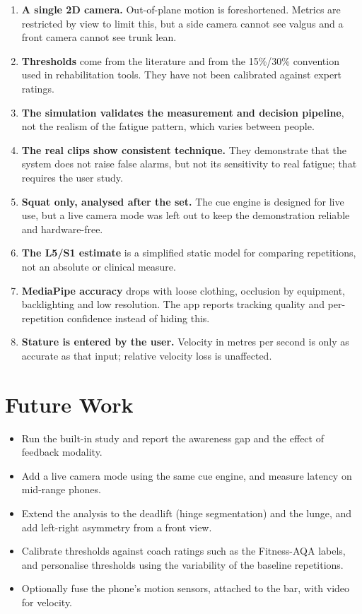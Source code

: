 \documentclass[12pt]{article}
\begin{document}
\begin{enumerate}
    \item \textbf{A single 2D camera.} Out-of-plane motion is foreshortened. Metrics are restricted by view to limit this, but a side camera cannot see valgus and a front camera cannot see trunk lean.
    \item \textbf{Thresholds} come from the literature and from the 15\%/30\% convention used in rehabilitation tools. They have not been calibrated against expert ratings.
    \item \textbf{The simulation validates the measurement and decision pipeline}, not the realism of the fatigue pattern, which varies between people.
    \item \textbf{The real clips show consistent technique.} They demonstrate that the system does not raise false alarms, but not its sensitivity to real fatigue; that requires the user study.
    \item \textbf{Squat only, analysed after the set.} The cue engine is designed for live use, but a live camera mode was left out to keep the demonstration reliable and hardware-free.
    \item \textbf{The L5/S1 estimate} is a simplified static model for comparing repetitions, not an absolute or clinical measure.
    \item \textbf{MediaPipe accuracy} drops with loose clothing, occlusion by equipment, backlighting and low resolution. The app reports tracking quality and per-repetition confidence instead of hiding this.
    \item \textbf{Stature is entered by the user.} Velocity in metres per second is only as accurate as that input; relative velocity loss is unaffected.
\end{enumerate}

\section{Future Work}

\begin{itemize}
    \item Run the built-in study and report the awareness gap and the effect of feedback modality.
    \item Add a live camera mode using the same cue engine, and measure latency on mid-range phones.
    \item Extend the analysis to the deadlift (hinge segmentation) and the lunge, and add left-right asymmetry from a front view.
    \item Calibrate thresholds against coach ratings such as the Fitness-AQA labels, and personalise thresholds using the variability of the baseline repetitions.
    \item Optionally fuse the phone's motion sensors, attached to the bar, with video for velocity.
\end{itemize}
\end{document}
